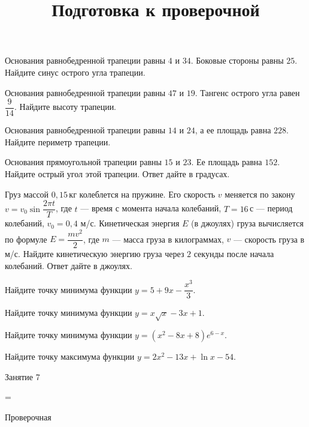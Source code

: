 \begin{homework}[number=3]
	\begin{listofex}
		\item Основания равнобедренной трапеции равны \( 4 \) и \( 34 \). Боковые стороны равны \( 25 \). Найдите синус острого угла трапеции.
		\item Основания равнобедренной трапеции равны \( 47 \) и \( 19 \). Тангенс острого угла равен \( \dfrac{9}{14} \).  Найдите высоту трапеции.
		\item Основания равнобедренной трапеции равны \( 14 \) и \( 24 \), а ее площадь равна \( 228 \). Найдите периметр трапеции.
		\item Основания прямоугольной трапеции равны \( 15 \) и \( 23 \). Ее площадь равна \( 152 \). Найдите острый угол этой трапеции. Ответ дайте в градусах.
		\item Груз массой \( 0,15 \) кг колеблется на пружине. Его скорость \( v \) меняется по закону \( v=v_0\sin\dfrac{2\pi t}{T} \),  где \( t \) --- время с момента начала колебаний, \( T=16 \) с --- период колебаний,  \( v_0=0,4 \) м/с. Кинетическая энергия \( E \) (в джоулях) груза вычисляется по формуле \( E=\dfrac{mv^2}{2} \),  где \( m \) --- масса груза в килограммах, \( v \) --- скорость груза в м/с. Найдите кинетическую энергию груза через \( 2 \) секунды после начала колебаний. Ответ дайте в джоулях.
		\item Найдите точку минимума функции \( y=5+9x-\dfrac{x^3}{3} \).
		\item Найдите точку минимума функции \( y=x\sqrt{x}-3x+1 \).
		\item Найдите точку минимума функции \( y=(x^2-8x+8)e^{6-x} \).
		\item Найдите точку максимума функции \( y=2x^2-13x+\ln x-54 \).
	\end{listofex}
\end{homework}

\begin{class}[number=7]
	\title{Подготовка к проверочной}
	\begin{listofex}
		\item Занятие 7
	\end{listofex}
\end{class}

=%
\begin{exam}
	\begin{listofex}
		\item Проверочная
	\end{listofex}
\end{exam}
